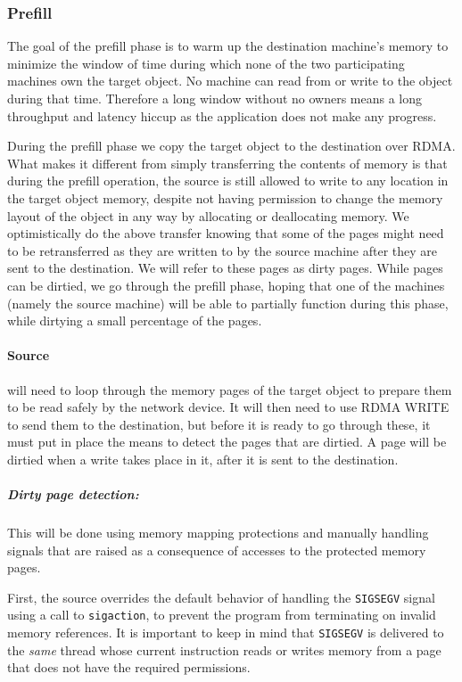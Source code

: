 \subsubsection{Prefill}
The goal of the prefill phase is to warm up the destination machine's memory to
minimize the window of time during which none of the two participating machines
own the target object. No machine can read from or write to the object during
that time. Therefore a long window without no owners means a long throughput
and latency hiccup as the application does not make any progress.

During the prefill phase we copy the target object to the destination over RDMA.
What makes it different from simply transferring the contents of memory is that
during the prefill operation, the source is still allowed to write to
any location in the target object memory,
despite not having permission to change the memory layout of the object
in any way by allocating or deallocating memory. We optimistically do the above
transfer knowing that some of the pages might need to be retransferred as they
are written to by the source machine after they are sent to the destination.
We will refer to these pages as dirty pages. While pages can be
dirtied, we go through the prefill phase, hoping that one of the
machines (namely the source machine) will be able to partially function during
this phase, while dirtying a small percentage of the pages.

\paragraph{Source} will need to loop through the memory pages of the target
object to prepare them to be read safely by the network device. It will then
need to use RDMA WRITE to send them to the destination, but before it is ready
to go through these, it must put in place the means to detect the pages that
are dirtied. A page will be dirtied when a write takes place in it, after
it is sent to the destination.

\subparagraph{Dirty page detection:}
This will be done using memory mapping protections and manually
handling signals that
are raised as a consequence of accesses to the protected memory pages.

First, the source overrides the default behavior of handling the
\texttt{SIGSEGV} signal using a call to
\texttt{sigaction}, to prevent the program from terminating on invalid memory
references. It is important to keep in mind that \texttt{SIGSEGV} is delivered
to the \emph{same} thread whose current instruction reads or writes memory
from a page that does not have the required permissions.

